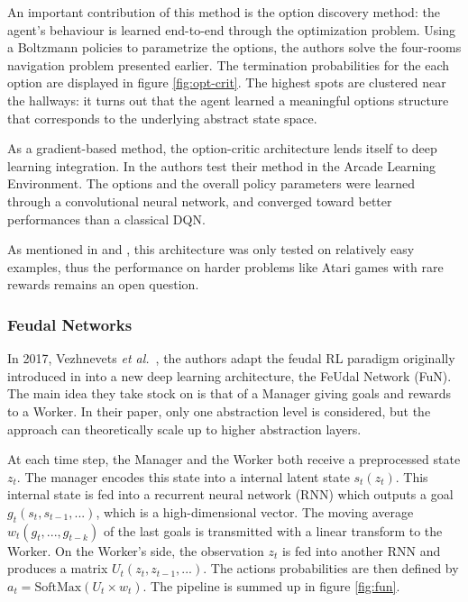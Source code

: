 \documentclass{article}
\newcommand{\etal}{\textit{et al.}}
\begin{document}
An important contribution of this method is the option discovery method: the agent's behaviour is learned end-to-end through the optimization problem. Using a Boltzmann policies to parametrize the options, the authors solve the four-rooms navigation problem presented earlier. The termination probabilities for the each option are displayed in figure \ref{fig:opt-crit}. The highest spots are clustered near the hallways: it turns out that the agent learned a meaningful options structure that corresponds to the underlying abstract state space.

As a gradient-based method, the option-critic architecture lends itself to deep learning integration. In \cite{bacon_option-critic_2016} the authors test their method in the Arcade Learning Environment. The options and the overall policy parameters were learned through a convolutional neural network, and converged toward better performances than a classical DQN.


As mentioned in \cite{alexander_strategic_2016} and \cite{vezhnevets_feudal_2017}, this architecture was only tested on relatively easy examples, thus the performance on harder problems like Atari games with rare rewards remains an open question.

\subsubsection{Feudal Networks}

In 2017, Vezhnevets \etal~\cite{vezhnevets_feudal_2017}, the authors adapt the feudal RL paradigm originally introduced in \cite{dayan_feudal_1993} into a new deep learning architecture, the FeUdal Network (FuN). The main idea they take stock on is that of a Manager giving goals and rewards to a Worker. In their paper, only one abstraction level is considered, but the approach can theoretically scale up to higher abstraction layers.

At each time step, the Manager and the Worker both receive a preprocessed state $z_t$. The manager encodes this state into a internal latent state $s_t(z_t)$. This internal state is fed into a recurrent neural network (RNN) which outputs a goal $g_t(s_t, s_{t-1}, ...)$, which is a high-dimensional vector. The moving average $w_t(g_t, ..., g_{t-k})$ of the last goals is transmitted with a linear transform to the Worker. On the Worker's side, the observation $z_t$ is fed into another RNN and produces a matrix $U_t(z_t, z_{t-1}, ...)$. The actions probabilities are then defined by $a_t = \mathrm{SoftMax}(U_t \times w_t)$. The pipeline is summed up in figure \ref{fig:fun}.
\end{document}

